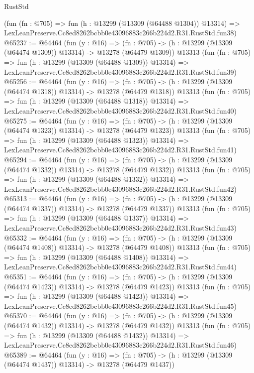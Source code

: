 \begin{lexlean}{RustStd}
\begin{coremodule}
    (fun (fn : @705) =>
    fun (h : @13299 (@13309 (@64488 @1304)) @13314) =>
    LexLeanPreserve.Cc8ed8262bcbb0e43096883c266b224d2.R31.RustStd.fun38)
@65237 := @64464
    (fun (y : @16) =>
    (fn : @705) -> (h : @13299 (@13309 (@64474 @1309)) @13314) -> @13278 (@64479 @1309))
    @13313
    (fun (fn : @705) =>
    fun (h : @13299 (@13309 (@64488 @1309)) @13314) =>
    LexLeanPreserve.Cc8ed8262bcbb0e43096883c266b224d2.R31.RustStd.fun39)
@65256 := @64464
    (fun (y : @16) =>
    (fn : @705) -> (h : @13299 (@13309 (@64474 @1318)) @13314) -> @13278 (@64479 @1318))
    @13313
    (fun (fn : @705) =>
    fun (h : @13299 (@13309 (@64488 @1318)) @13314) =>
    LexLeanPreserve.Cc8ed8262bcbb0e43096883c266b224d2.R31.RustStd.fun40)
@65275 := @64464
    (fun (y : @16) =>
    (fn : @705) -> (h : @13299 (@13309 (@64474 @1323)) @13314) -> @13278 (@64479 @1323))
    @13313
    (fun (fn : @705) =>
    fun (h : @13299 (@13309 (@64488 @1323)) @13314) =>
    LexLeanPreserve.Cc8ed8262bcbb0e43096883c266b224d2.R31.RustStd.fun41)
@65294 := @64464
    (fun (y : @16) =>
    (fn : @705) -> (h : @13299 (@13309 (@64474 @1332)) @13314) -> @13278 (@64479 @1332))
    @13313
    (fun (fn : @705) =>
    fun (h : @13299 (@13309 (@64488 @1332)) @13314) =>
    LexLeanPreserve.Cc8ed8262bcbb0e43096883c266b224d2.R31.RustStd.fun42)
@65313 := @64464
    (fun (y : @16) =>
    (fn : @705) -> (h : @13299 (@13309 (@64474 @1337)) @13314) -> @13278 (@64479 @1337))
    @13313
    (fun (fn : @705) =>
    fun (h : @13299 (@13309 (@64488 @1337)) @13314) =>
    LexLeanPreserve.Cc8ed8262bcbb0e43096883c266b224d2.R31.RustStd.fun43)
@65332 := @64464
    (fun (y : @16) =>
    (fn : @705) -> (h : @13299 (@13309 (@64474 @1408)) @13314) -> @13278 (@64479 @1408))
    @13313
    (fun (fn : @705) =>
    fun (h : @13299 (@13309 (@64488 @1408)) @13314) =>
    LexLeanPreserve.Cc8ed8262bcbb0e43096883c266b224d2.R31.RustStd.fun44)
@65351 := @64464
    (fun (y : @16) =>
    (fn : @705) -> (h : @13299 (@13309 (@64474 @1423)) @13314) -> @13278 (@64479 @1423))
    @13313
    (fun (fn : @705) =>
    fun (h : @13299 (@13309 (@64488 @1423)) @13314) =>
    LexLeanPreserve.Cc8ed8262bcbb0e43096883c266b224d2.R31.RustStd.fun45)
@65370 := @64464
    (fun (y : @16) =>
    (fn : @705) -> (h : @13299 (@13309 (@64474 @1432)) @13314) -> @13278 (@64479 @1432))
    @13313
    (fun (fn : @705) =>
    fun (h : @13299 (@13309 (@64488 @1432)) @13314) =>
    LexLeanPreserve.Cc8ed8262bcbb0e43096883c266b224d2.R31.RustStd.fun46)
@65389 := @64464
    (fun (y : @16) =>
    (fn : @705) -> (h : @13299 (@13309 (@64474 @1437)) @13314) -> @13278 (@64479 @1437))

\end{coremodule}
\end{lexlean}
